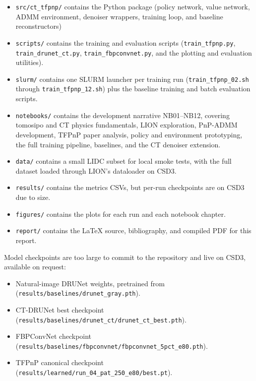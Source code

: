 \begin{itemize}
    \item \texttt{src/ct\_tfpnp/} contains the Python package (policy network, value network, ADMM environment, denoiser wrappers, training loop, and baseline reconstructors)
    \item \texttt{scripts/} contains the training and evaluation scripts (\texttt{train\_tfpnp.py}, \texttt{train\_drunet\_ct.py}, \texttt{train\_fbpconvnet.py}, and the plotting and evaluation utilities). 
    \item \texttt{slurm/} contains one SLURM launcher per training run (\texttt{train\_tfpnp\_02.sh} through \texttt{train\_tfpnp\_12.sh}) plus the baseline training and batch evaluation scripts. 
    \item \texttt{notebooks/} contains the development narrative NB01--NB12, covering tomosipo and CT physics fundamentals, LION exploration, PnP-ADMM development, TFPnP paper analysis, policy and environment prototyping, the full training pipeline, baselines, and the CT denoiser extension. 
    \item \texttt{data/} contains a small LIDC subset for local smoke tests, with the full dataset loaded through LION's dataloader on CSD3. 
    \item \texttt{results/} contains the metrics CSVs, but per-run checkpoints are on CSD3 due to size.
    \item \texttt{figures/} contains the plots for each run and each notebook chapter. 
    \item \texttt{report/} contains the LaTeX source, bibliography, and compiled PDF for this report.
\end{itemize}

Model checkpoints are too large to commit to the repository and live on CSD3, available on request:

\begin{itemize}
    \item Natural-image DRUNet weights, pretrained
          from~\citet{zhang2021plug}
          (\texttt{results/baselines/drunet\_gray.pth}).
    \item CT-DRUNet best checkpoint
          (\texttt{results/baselines/drunet\_ct/drunet\_ct\_best.pth}).
    \item FBPConvNet checkpoint
          (\texttt{results/baselines/fbpconvnet/fbpconvnet\_5pct\_e80.pth}).
    \item TFPnP canonical checkpoint
          (\texttt{results/learned/run\_04\_pat\_250\_e80/best.pt}).
\end{itemize}

